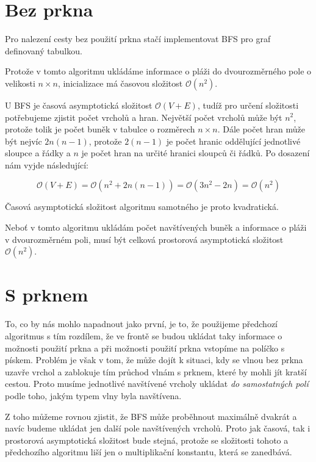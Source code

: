 \documentclass{fkssolpub}
\author{Ondřej Sedláček}
\begin{document}
 

\section{Bez prkna}

Pro nalezení cesty bez použití prkna stačí implementovat BFS pro graf
definovaný tabulkou. 

Protože v tomto algoritmu ukládáme informace o pláži do dvourozměrného
pole o velikosti $n \times n$, inicializace má časovou složitost $\mathcal{O}(n^2)$.

U BFS je časová asymptotická složitost $\mathcal{O}(V + E)$, tudíž
pro určení složitosti potřebujeme zjistit počet vrcholů a hran. 
Největší počet vrcholů může být $n^2$, protože tolik je počet buněk v
tabulce o rozměrech $n \times n$. Dále počet hran může být nejvíc $2n(n - 1)$,
protože $2(n - 1)$ je počet hranic oddělující jednotlivé sloupce a řádky
a $n$ je počet hran na určité hranici sloupců či řádků. Po dosazení nám
vyjde následující:

\[
  \mathcal{O}(V + E) = \mathcal{O}(n^2 + 2n(n - 1)) = \mathcal{O}(3n^2 - 2n)
   = \mathcal{O}(n^2)
\]

Časová asymptotická složitost algoritmu samotného je proto kvadratická.

Neboť v tomto algoritmu ukládám počet navštívených buněk a informace o 
pláži v dvourozměrném poli, musí být celková prostorová asymptotická 
složitost $\mathcal{O}(n^2)$.

\section{S prknem}

To, co by nás mohlo napadnout jako první, je to, že použijeme předchozí
algoritmus s tím rozdílem, že ve frontě se budou ukládat taky 
informace o možnosti použití prkna a při možnosti použití prkna 
vstopíme na políčko s pískem. Problém je však v tom, že může dojít k 
situaci, kdy se vlnou bez prkna uzavře vrchol a zablokuje tím průchod 
vlnám s prknem, které by mohli jít kratší cestou. Proto musíme 
jednotlivé navštívené vrcholy ukládat \textit{do samostatných polí} podle 
toho, jakým typem vlny byla navštívena.

Z toho můžeme rovnou zjistit, že BFS může proběhnout maximálně dvakrát a 
navíc budeme ukládat jen další pole navštívených vrcholů. Proto jak 
časová, tak i prostorová asymptotická složitost bude stejná, protože 
se složitosti tohoto a předchozího algoritmu liší jen o multiplikační 
konstantu, která se zanedbává.
\end{document}
